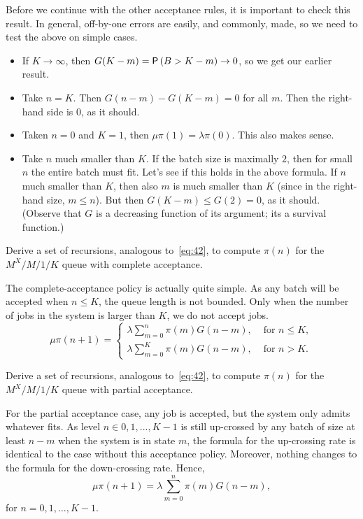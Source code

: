\begin{exercise}
\begin{solution}
 Before we continue with the other acceptance rules, it is important
 to check this result. In general, off-by-one errors are easily, and
 commonly, made, so we need to test the above on simple cases. 
 \begin{itemize}
 \item If $K\to \infty$, then $G(K-m)=\P{B>K-m}\to 0$, so we get our earlier result. 
 \item Take $n=K$. Then $G(n-m)-G(K-m)=0$ for all $m$. Then the right-hand side is 0, as it should.
 \item Taken $n=0$ and $K=1$, then $\mu \pi(1)= \lambda \pi(0)$. This also makes sense. 
 \item Take $n$ much smaller than $K$. If the batch size is maximally
 $2$, then for small $n$ the entire batch must fit. Let's see if
 this holds in the above formula. If $n$ much smaller than $K$,
 then also $m$ is much smaller than $K$ (since in the right-hand
 size, $m\leq n$). But then $G(K-m) \leq G(2) = 0$, as it
 should. (Observe that $G$ is a decreasing function of its argument;
 its a survival function.)
 \end{itemize}
\end{solution}
\end{exercise}


\begin{extra}
 Derive a set of recursions, analogous to~\cref{eq:42}, to compute $\pi(n)$ for the $M^X/M/1/K$ queue with complete acceptance.
\begin{solution}
 The complete-acceptance policy is actually quite simple. As any
 batch will be accepted when $n\leq K$, the queue length is not
 bounded. Only when the number of jobs in the system is larger than
 $K$, we do not accept jobs. 
 \begin{equation*}
 \mu \pi(n+1) = 
 \begin{cases}
 \lambda \sum_{m=0}^n \pi(m) G(n-m), & \text{ for } n\leq K,\\
 \lambda \sum_{m=0}^K \pi(m) G(n-m), & \text{ for } n> K.
 \end{cases}
 \end{equation*}
\end{solution}
\end{extra}

\begin{extra}
 Derive a set of recursions, analogous to~\cref{eq:42}, to compute $\pi(n)$ for the $M^X/M/1/K$ queue with partial acceptance.
\begin{solution}
 For the partial acceptance case, any job is accepted, but the system only admits whatever fits.
 As level $n\in {0,1,...,K-1}$ is still up-crossed by any batch of size at least $n-m$ when the system is in state $m$, the formula for the up-crossing rate is identical to the case without this acceptance policy.
 Moreover, nothing changes to the formula for the down-crossing rate.
 Hence,
 \begin{equation*}
 \mu \pi(n+1) = \lambda \sum_{m=0}^n \pi(m) G(n-m), 
 \end{equation*}
 for $n=0,1,\ldots, K-1$. 
\end{solution}
\end{extra}


